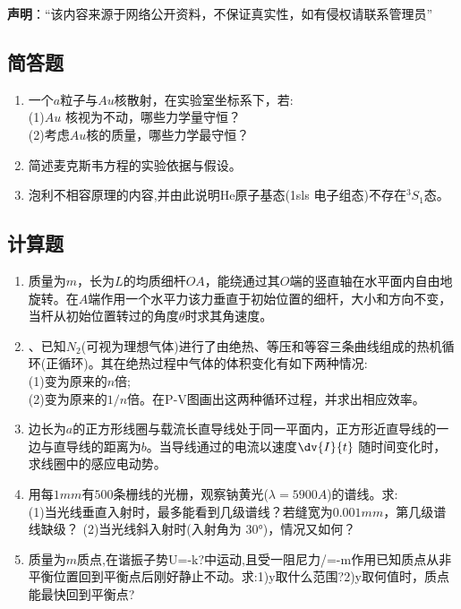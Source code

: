 
\textbf{声明}：“该内容来源于网络公开资料，不保证真实性，如有侵权请联系管理员”

\subsection{简答题}
\begin{enumerate}
\item 一个$a$粒子与$Au$核散射，在实验室坐标系下，若:\\
(1)$Au$ 核视为不动，哪些力学量守恒？\\
(2)考虑$Au$核的质量，哪些力学最守恒？
\item 简述麦克斯韦方程的实验依据与假设。
\item 泡利不相容原理的内容,并由此说明He原子基态(1sls 电子组态)不存在$^3S_1$态。
\end{enumerate}
\subsection{计算题}
\begin{enumerate}
\item 质量为$m$，长为$L$的均质细杆$OA$，能绕通过其$O$端的竖直轴在水平面内自由地旋转。在$A$端作用一个水平力该力垂直于初始位置的细杆，大小和方向不变，当杆从初始位置转过的角度$\theta$时求其角速度。
\item 、已知$ N_2$(可视为理想气体)进行了由绝热、等压和等容三条曲线组成的热机循环(正循环)。其在绝热过程中气体的体积变化有如下两种情况:\\
(1)变为原来的$n$倍;\\
(2)变为原来的$1/n$倍。在P-V图画出这两种循环过程，并求出相应效率。
\item 边长为$a$的正方形线圈与载流长直导线处于同一平面内，正方形近直导线的一边与直导线的距离为$b$。当导线通过的电流以速度$\dv{I}{t}$ 随时间变化时，求线圈中的感应电动势。
\item 用每$1mm$有$500$条栅线的光栅，观察钠黄光($\lambda=5900A$)的谱线。求:\\
(1)当光线垂直入射时，最多能看到几级谱线？若缝宽为$0.001mm$，第几级谱线缺级？
(2)当光线斜入射时(入射角为 $30$°)，情况又如何？
\item 质量为$m$质点,在谐振子势U=-k?中运动,且受一阻尼力/=-m作用已知质点从非平衡位置回到平衡点后刚好静止不动。求:1)y取什么范围?2)y取何值时，质点能最快回到平衡点?
\end{enumerate}
